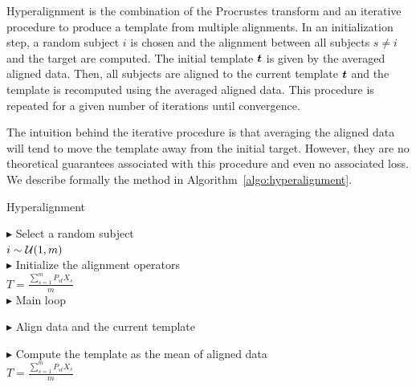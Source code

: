 Hyperalignment is the combination of the Procrustes transform and an iterative
procedure to produce a template from multiple alignments.
In an initialization step, a random subject $i$ is chosen and the alignment
between all subjects $s \neq i$ and the target are computed. The initial
template $\boldsymbol{t}$ is given by the averaged aligned data. Then, all subjects are
aligned to the current template $\boldsymbol{t}$ and the template is recomputed using the
averaged aligned data. This procedure is repeated for a given number of
iterations until convergence.

The intuition behind the iterative procedure is that averaging the aligned data
will tend to move the template away from the initial target. However, they are
no theoretical guarantees associated with this procedure and even no associated loss.
We describe formally
the method in Algorithm~\ref{algo:hyperalignment}.

\begin{algorithm}[H]
  \SetAlgoLined
  \caption{Hyperalignment}
  \label{algo:hyperalignment}
  $\blacktriangleright$ Select a random subject \\
  $i \sim \mathcal{U}(1, m)$ \\
  $\blacktriangleright$ Initialize the alignment operators \\
  $T = \frac{\sum_{s=1}^m P_{st} X_s}{m}$ \\

  $\blacktriangleright$ Main loop \\
  {
    $\blacktriangleright$ Align data and the current template \\

    $\blacktriangleright$ Compute the template as the mean of aligned data \\
    $T = \frac{\sum_{s=1}^m P_{st} X_s}{m}$ \\
    }
\end{algorithm}



